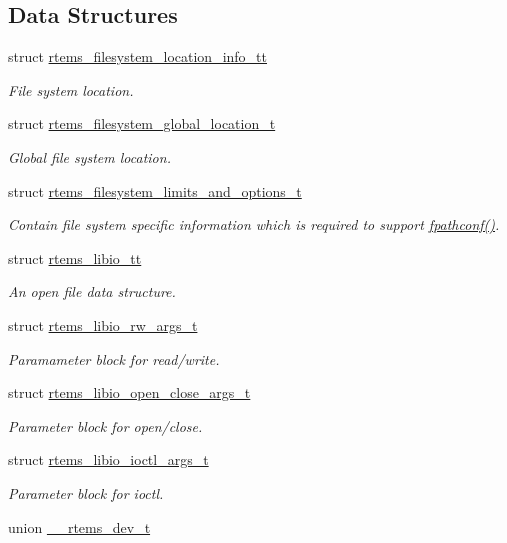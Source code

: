 \subsection*{Data Structures}
\begin{DoxyCompactItemize}
\item 
struct \mbox{\hyperlink{structrtems__filesystem__location__info__tt}{rtems\+\_\+filesystem\+\_\+location\+\_\+info\+\_\+tt}}
\begin{DoxyCompactList}\small\item\em File system location. \end{DoxyCompactList}\item 
struct \mbox{\hyperlink{structrtems__filesystem__global__location__t}{rtems\+\_\+filesystem\+\_\+global\+\_\+location\+\_\+t}}
\begin{DoxyCompactList}\small\item\em Global file system location. \end{DoxyCompactList}\item 
struct \mbox{\hyperlink{structrtems__filesystem__limits__and__options__t}{rtems\+\_\+filesystem\+\_\+limits\+\_\+and\+\_\+options\+\_\+t}}
\begin{DoxyCompactList}\small\item\em Contain file system specific information which is required to support \mbox{\hyperlink{fpathconf_8c_a71e43208c97faad6658a5f7d7daa92cd}{fpathconf()}}. \end{DoxyCompactList}\item 
struct \mbox{\hyperlink{structrtems__libio__tt}{rtems\+\_\+libio\+\_\+tt}}
\begin{DoxyCompactList}\small\item\em An open file data structure. \end{DoxyCompactList}\item 
struct \mbox{\hyperlink{structrtems__libio__rw__args__t}{rtems\+\_\+libio\+\_\+rw\+\_\+args\+\_\+t}}
\begin{DoxyCompactList}\small\item\em Paramameter block for read/write. \end{DoxyCompactList}\item 
struct \mbox{\hyperlink{structrtems__libio__open__close__args__t}{rtems\+\_\+libio\+\_\+open\+\_\+close\+\_\+args\+\_\+t}}
\begin{DoxyCompactList}\small\item\em Parameter block for open/close. \end{DoxyCompactList}\item 
struct \mbox{\hyperlink{structrtems__libio__ioctl__args__t}{rtems\+\_\+libio\+\_\+ioctl\+\_\+args\+\_\+t}}
\begin{DoxyCompactList}\small\item\em Parameter block for ioctl. \end{DoxyCompactList}\item 
union \mbox{\hyperlink{union____rtems__dev__t}{\+\_\+\+\_\+rtems\+\_\+dev\+\_\+t}}
\end{DoxyCompactItemize}

